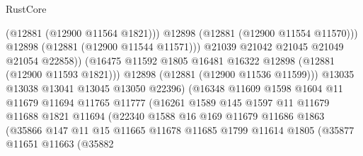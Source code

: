 \begin{lexlean}{RustCore}
\begin{coremodule}
                                        (@12881 (@12900 @11564 @1821)))
                                      @12898
                                      (@12881 (@12900 @11554 @11570)))
                                    @12898
                                    (@12881 (@12900 @11544 @11571)))
                                  @21039
                                  @21042
                                  @21045
                                  @21049
                                  @21054
                                  @22858))
                              (@16475
                                @11592
                                @1805
                                @16481
                                @16322
                                @12898
                                (@12881 (@12900 @11593 @1821)))
                              @12898
                              (@12881 (@12900 @11536 @11599)))
                            @13035
                            @13038
                            @13041
                            @13045
                            @13050
                            @22396)
                          (@16348
                            @11609
                            @1598
                            @1604
                            @11
                            @11679
                            @11694
                            @11765
                            @11777
                            (@16261
                              @1589
                              @145
                              @1597
                              @11
                              @11679
                              @11688
                              @1821
                              @11694
                              (@22340
                                @1588
                                @16
                                @169
                                @11679
                                @11686
                                @1863
                                (@35866
                                  @147
                                  @11
                                  @15
                                  @11665
                                  @11678
                                  @11685
                                  @1799
                                  @11614
                                  @1805
                                  (@35877
                                    @11651
                                    @11663
                                    (@35882

\end{coremodule}
\end{lexlean}
